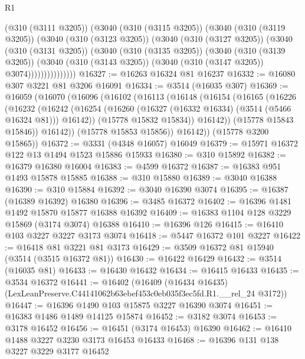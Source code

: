 \begin{lexlean}{R1}
\begin{coremodule}
                (@310 (@3111 @3205))
                (@3040
                  (@310 (@3115 @3205))
                  (@3040
                    (@310 (@3119 @3205))
                    (@3040
                      (@310 (@3123 @3205))
                      (@3040
                        (@310 (@3127 @3205))
                        (@3040
                          (@310 (@3131 @3205))
                          (@3040
                            (@310 (@3135 @3205))
                            (@3040
                              (@310 (@3139 @3205))
                              (@3040
                                (@310 (@3143 @3205))
                                (@3040 (@310 (@3147 @3205)) @3074)))))))))))))))
@16327 := @16263 @16324 @81 @16237
@16332 := @16080 @307 @3221 @81 @3206 @16091
@16334 := @3514 (@16035 @307)
@16369 := @16059
    (@16070
      (@16096
        (@16102
          (@16113
            (@16148
              (@16154
                (@16165
                  (@16226
                    (@16232
                      (@16242
                        (@16254 (@16260 (@16327 (@16332 @16334) (@3514 (@5466 @16324 @81))) @16142))
                        (@15778 @15832 @15834))
                      @16142))
                  (@15778 @15843 @15846))
                @16142))
            (@15778 @15853 @15856))
          @16142))
      (@15778 @3200 @15865))
@16372 := @3331 (@4348 @16057) @16049
@16379 := @15971 @16372 @122 @13 @1494 @1523 @15886 @15933
@16380 := @310 @15892
@16382 := @16379 @16380 @16004
@16383 := @4599 @16372
@16387 := @16383 @951 @1493 @15878 @15885
@16388 := @310 @15880
@16389 := @3040 @16388
@16390 := @310 @15884
@16392 := @3040 @16390 @3074
@16395 := @16387 (@16389 @16392) @16380
@16396 := @3485 @16372
@16402 := @16396 @1481 @1492 @15870 @15877 @16388 @16392
@16409 := @16383 @1104 @128 @3229 @15869 (@3174 @3074) @16388
@16410 := @16396 @126
@16415 := @16410 @103 @3227 @3227 @3173 @3074
@16418 := @5447 @16372 @101 @3227
@16422 := @16418 @81 @3221 @81 @3173
@16429 := @3509 @16372 @81 @15940 (@3514 (@3515 @16372 @81))
@16430 := @16422 @16429
@16432 := @3514 (@16035 @81)
@16433 := @16430 @16432
@16434 := @16415 @16433
@16435 := @3534 @16372
@16441 := @16402
    (@16409 (@16434 @16435) (LexLeanPreserve.C44141062b63ebef453c0eb035f3ec5fd.R1.__rel_24 @3172))
@16447 := @16396 @1490 @103 @15875 @3227 @16390 @3074
@16451 := @16383 @1486 @1489 @14125 @15874
@16452 := @3182 @3074
@16453 := @3178 @16452
@16456 := @16451 (@3174 @16453) @16390
@16462 := @16410 @1488 @3227 @3230 @3173 @16453 @16433
@16468 := @16396 @131 @138 @3227 @3229 @3177 @16452

\end{coremodule}
\end{lexlean}
